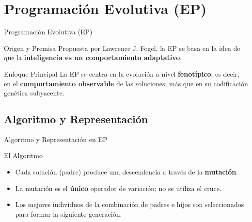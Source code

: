 \documentclass[aspectratio=169,xcolor=dvipsnames]{beamer}
\begin{document}
\section{Programación Evolutiva (EP)}

\begin{frame}{Programación Evolutiva (EP)}
    \begin{block}{Origen y Premisa}
    Propuesta por Lawrence J. Fogel, la EP se basa en la idea de que la \textbf{inteligencia es un comportamiento adaptativo}.
    \end{block}
    
    \begin{alertblock}{Enfoque Principal}
    La EP se centra en la evolución a nivel \textbf{fenotípico}, es decir, en el \textbf{comportamiento observable} de las soluciones, más que en su codificación genética subyacente.
    \end{alertblock}
\end{frame}

\subsection{Algoritmo y Representación}

\begin{frame}{Algoritmo y Representación en EP}
            \begin{block}{El Algoritmo}
                \begin{itemize}
                    \item Cada solución (padre) produce una descendencia a través de la \textbf{mutación}.
                    \item La mutación es el \textbf{único} operador de variación; no se utiliza el cruce.
                    \item Los mejores individuos de la combinación de padres e hijos son seleccionados para formar la siguiente generación.
                \end{itemize}
            \end{block}

        
\end{frame}
\end{document}
